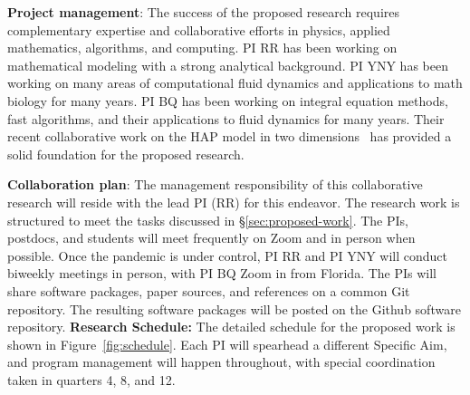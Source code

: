\textbf{Project management}: 
%
The success of the proposed research requires complementary expertise
and collaborative efforts in physics, applied mathematics, algorithms,
and computing. PI RR has been working on mathematical modeling with a
strong analytical background. PI YNY has been working on many areas of
computational fluid dynamics and applications to math biology for many
years. PI BQ has been working on integral equation methods, fast
algorithms, and their applications to fluid dynamics for many years.
Their recent collaborative work on the HAP model in two
dimensions~\cite{FuQuRyYo20} has provided a solid foundation for the
proposed research.

\smallskip

\textbf{Collaboration plan}: 
%
The management responsibility of this collaborative research will reside
with the lead PI (RR) for this endeavor. The research work is structured
to meet the tasks discussed in \S\ref{sec:proposed-work}. The PIs,
postdocs, and students will meet frequently on Zoom and in person when
possible.
Once the pandemic is under control, PI RR and PI
YNY will conduct biweekly meetings in person, with PI BQ Zoom in from
Florida. The PIs will share software packages, paper sources, and
references on a common \textsf{Git} repository. The resulting software
packages will be posted on the \textsf{Github} software repository.
%
%
\textbf{Research Schedule:} The detailed schedule for the proposed work
is shown in Figure~\ref{fig:schedule}. Each PI will spearhead a
different Specific Aim, and program management will happen
throughout, with special coordination taken in quarters 4, 8, and
12.


